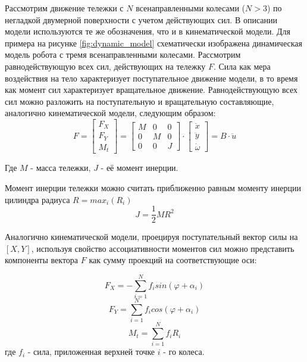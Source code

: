 \documentclass[oneside,final,14pt]{extreport}
\begin{document}
Рассмотрим движение тележки с $N$ всенаправленными колесами ($N > 3$) по негладкой двумерной поверхности с учетом действующих сил. В описании модели используются те же обозначения, что и в кинематической модели. Для примера на рисунке \ref{fig:dynamic_model} схематически изображена динамическая модель робота с тремя всенаправленными колесами. Рассмотрим равнодействующую всех сил, действующих на тележку $F$. Сила как мера воздействия на тело характеризует поступательное движение модели, в то время как момент сил характеризует вращательное движение. Равнодействующую всех сил можно разложить на поступательную и вращательную составляющие, аналогично кинематической модели, следующим образом:
\begin{equation}
F
=
\begin{bmatrix}
F_{X} \\
F_{Y} \\
M_{t}
\end{bmatrix}
=
\begin{bmatrix}
M & 0 & 0 \\
0 & M & 0 \\
0 & 0 & J
\end{bmatrix}
\cdot
\begin{bmatrix}
\ddot{x} \\
\ddot{y} \\
\dot{\omega}
\end{bmatrix}
=
B \cdot \ddot{u}
\end{equation}

Где $M$ - масса тележки, $J$ - её момент инерции. 

\begin{figure}[H]
\end{figure}
Момент инерции тележки можно считать приближенно равным моменту инерции цилиндра радиуса $R=max_{i}(R_{i})$ 
\begin{equation}
J
=
\frac{1}{2}
MR^{2}
\end{equation}



Аналогично кинематической модели,
проецируя поступательный вектор силы на $[X,Y]$,  используя свойство ассоциативности моментов сил
можно представить компоненты вектора $F$ как сумму проекций на соответствующие оси:

\begin{equation}
F_{X}
=
-
\sum_{i=1}^{N}f_{i} sin(\varphi +\alpha_{i})
\end{equation}
\begin{equation}
F_{Y}
=
\sum_{i=1}^{N}f_{i} cos(\varphi +\alpha_{i})
\end{equation}
\begin{equation}
M_{t}
=
\sum_{i=1}^{N}f_{i}R_{i}
\end{equation}
где $f_{i}$ - сила, приложенная верхней точке $i$ - го колеса. 
\end{document}
